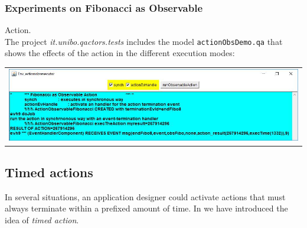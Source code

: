 

\subsubsection{Experiments on Fibonacci as Observable} Action.\\

The project \textit{it.unibo.qactors.tests} includes the model \texttt{actionObsDemo.qa} that shows the effects of the action in the different execution modes:



\begin{center}
\begin{tabular}{ c }
     \includegraphics[scale = 0.6]{img/actionObs.jpg}\\
\end{tabular}{   }
\end{center}


 \newpage 
\subsection{Timed actions}

In several situations, an application designer could activate actions that must always terminate within a prefixed amount of time. In  we have introduced the idea of \textit{timed action}.

